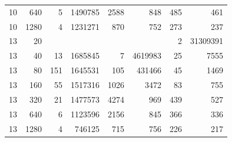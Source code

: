 \begin{table}[p]
\begin{minipage}[c]{0.49\textwidth}
\begin{tabular}{|rr|rr|rr|rr|}
\num{10} &  \num{640} &   \num{5} &   \num{1490785} & \num{2588} &     \num{848} & \num{485} &     \num{461} \\
\num{10} & \num{1280} &   \num{4} &   \num{1231271} &  \num{870} &     \num{752} & \num{273} &     \num{237} \\
\hline
\num{13} &   \num{20} &           &               &            &               &   \num{2} & \num{31309391} \\
\num{13} &   \num{40} &  \num{13} & \num{1685845} &    \num{7} & \num{4619983} &  \num{25} &     \num{7555} \\
\num{13} &   \num{80} & \num{151} & \num{1645531} &  \num{105} &  \num{431466} &  \num{45} &     \num{1469} \\
\num{13} &  \num{160} &  \num{55} & \num{1517316} & \num{1026} &    \num{3472} &  \num{83} &      \num{755} \\
\num{13} &  \num{320} &  \num{21} & \num{1477573} & \num{4274} &     \num{969} & \num{439} &      \num{527} \\
\num{13} &  \num{640} &   \num{6} & \num{1123596} & \num{2156} &     \num{845} & \num{366} &      \num{336} \\
\num{13} & \num{1280} &   \num{4} &  \num{746125} &  \num{715} &     \num{756} & \num{226} &      \num{217} \\
\hline
\end{tabular}
\label{tab:patterns_count_apm}
\end{minipage}


\end{table}
